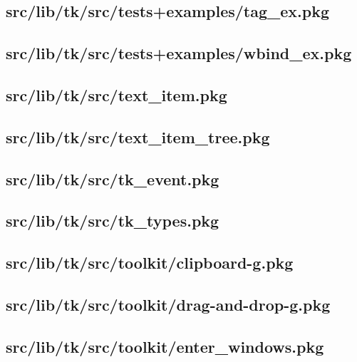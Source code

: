 \subsection{src/lib/tk/src/tests+examples/tag\_ex.pkg}


\subsection{src/lib/tk/src/tests+examples/wbind\_ex.pkg}


\subsection{src/lib/tk/src/text\_item.pkg}


\subsection{src/lib/tk/src/text\_item\_tree.pkg}


\subsection{src/lib/tk/src/tk\_event.pkg}


\subsection{src/lib/tk/src/tk\_types.pkg}


\subsection{src/lib/tk/src/toolkit/clipboard-g.pkg}


\subsection{src/lib/tk/src/toolkit/drag-and-drop-g.pkg}


\subsection{src/lib/tk/src/toolkit/enter\_windows.pkg}



